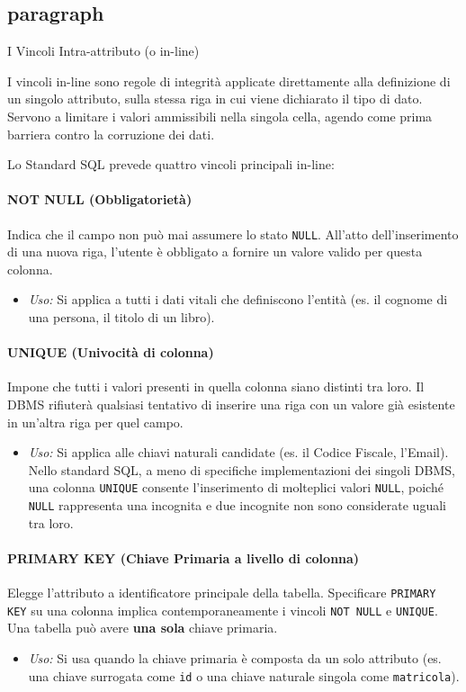 \subsection{paragraph}{I Vincoli Intra-attributo (o in-line)}

I vincoli in-line sono regole di integrità applicate direttamente alla definizione di un singolo attributo, sulla stessa riga in cui viene dichiarato il tipo di dato. Servono a limitare i valori ammissibili nella singola cella, agendo come prima barriera contro la corruzione dei dati.

Lo Standard SQL prevede quattro vincoli principali in-line:

\paragraph{NOT NULL (Obbligatorietà)}
Indica che il campo non può mai assumere lo stato \texttt{NULL}. All'atto dell'inserimento di una nuova riga, l'utente è obbligato a fornire un valore valido per questa colonna.
\begin{itemize}
    \item \textit{Uso:} Si applica a tutti i dati vitali che definiscono l'entità (es. il cognome di una persona, il titolo di un libro).
\end{itemize}

\paragraph{UNIQUE (Univocità di colonna)}
Impone che tutti i valori presenti in quella colonna siano distinti tra loro. Il DBMS rifiuterà qualsiasi tentativo di inserire una riga con un valore già esistente in un'altra riga per quel campo.
\begin{itemize}
    \item \textit{Uso:} Si applica alle chiavi naturali candidate (es. il Codice Fiscale, l'Email). Nello standard SQL, a meno di specifiche implementazioni dei singoli DBMS, una colonna \texttt{UNIQUE} consente l'inserimento di molteplici valori \texttt{NULL}, poiché \texttt{NULL} rappresenta una incognita e due incognite non sono considerate uguali tra loro.
\end{itemize}

\paragraph{PRIMARY KEY (Chiave Primaria a livello di colonna)}
Elegge l'attributo a identificatore principale della tabella. Specificare \texttt{PRIMARY KEY} su una colonna implica contemporaneamente i vincoli \texttt{NOT NULL} e \texttt{UNIQUE}. Una tabella può avere \textbf{una sola} chiave primaria.
\begin{itemize}
    \item \textit{Uso:} Si usa quando la chiave primaria è composta da un solo attributo (es. una chiave surrogata come \texttt{id} o una chiave naturale singola come \texttt{matricola}).
\end{itemize}

